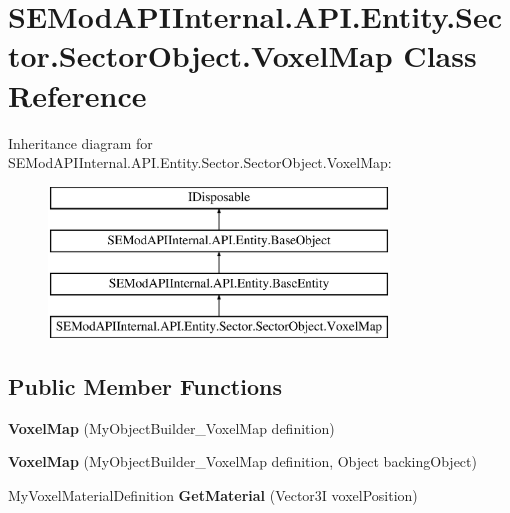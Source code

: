 \hypertarget{class_s_e_mod_a_p_i_internal_1_1_a_p_i_1_1_entity_1_1_sector_1_1_sector_object_1_1_voxel_map}{}\section{S\+E\+Mod\+A\+P\+I\+Internal.\+A\+P\+I.\+Entity.\+Sector.\+Sector\+Object.\+Voxel\+Map Class Reference}
\label{class_s_e_mod_a_p_i_internal_1_1_a_p_i_1_1_entity_1_1_sector_1_1_sector_object_1_1_voxel_map}
Inheritance diagram for S\+E\+Mod\+A\+P\+I\+Internal.\+A\+P\+I.\+Entity.\+Sector.\+Sector\+Object.\+Voxel\+Map\+:\begin{figure}[H]
\begin{center}
\leavevmode
\includegraphics[height=4.000000cm]{class_s_e_mod_a_p_i_internal_1_1_a_p_i_1_1_entity_1_1_sector_1_1_sector_object_1_1_voxel_map}
\end{center}
\end{figure}
\subsection*{Public Member Functions}
\begin{DoxyCompactItemize}
\item 
\hypertarget{class_s_e_mod_a_p_i_internal_1_1_a_p_i_1_1_entity_1_1_sector_1_1_sector_object_1_1_voxel_map_aed19579bfc924a27612bfa1cea074bd3}{}{\bfseries Voxel\+Map} (My\+Object\+Builder\+\_\+\+Voxel\+Map definition)\label{class_s_e_mod_a_p_i_internal_1_1_a_p_i_1_1_entity_1_1_sector_1_1_sector_object_1_1_voxel_map_aed19579bfc924a27612bfa1cea074bd3}

\item 
\hypertarget{class_s_e_mod_a_p_i_internal_1_1_a_p_i_1_1_entity_1_1_sector_1_1_sector_object_1_1_voxel_map_ac415517d48042ec65b22d718e2b3bec5}{}{\bfseries Voxel\+Map} (My\+Object\+Builder\+\_\+\+Voxel\+Map definition, Object backing\+Object)\label{class_s_e_mod_a_p_i_internal_1_1_a_p_i_1_1_entity_1_1_sector_1_1_sector_object_1_1_voxel_map_ac415517d48042ec65b22d718e2b3bec5}

\item 
\hypertarget{class_s_e_mod_a_p_i_internal_1_1_a_p_i_1_1_entity_1_1_sector_1_1_sector_object_1_1_voxel_map_a0a66194ed583e434e02bb884e92426d5}{}My\+Voxel\+Material\+Definition {\bfseries Get\+Material} (Vector3\+I voxel\+Position)\label{class_s_e_mod_a_p_i_internal_1_1_a_p_i_1_1_entity_1_1_sector_1_1_sector_object_1_1_voxel_map_a0a66194ed583e434e02bb884e92426d5}

\end{DoxyCompactItemize}
